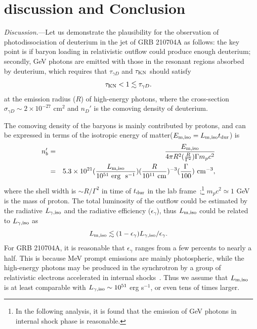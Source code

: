 \documentclass[linenumbers,twocolumn]{aastex631}
\begin{document}
\section{discussion and Conclusion }\label{sec:discussion}

\textit{Discussion.}---Let us demonstrate
the plausibility for the observation of photodissociation of deuterium in the jet of GRB 210704A as follows: the key point is if baryon loading in relativistic outflow could produce enough deuterium;
secondly, GeV photons are emitted with those in the resonant regions absorbed by deuterium, which requires that $\tau_{\gamma D}$ and $\tau_{\rm KN}$ should satisfy 
\begin{equation}\label{eq:criterion}
    \tau_{\rm KN}<1\lesssim\tau_{\gamma D}.
\end{equation}
at the emission radius ($R$) of high-energy photons, where the cross-section $\sigma_{\gamma D} \sim 2 \times 10^{-27}$ cm$^2$ and $n_D'$ is the comoving density of deuterium. 

The comoving density of the baryons is mainly contributed by protons, and can be expressed in terms of the isotropic energy of matter($E_{\rm m, iso}=L_{\rm m, iso} t_{\rm dur}$) is 
\begin{eqnarray}\label{eq:nbp}
     n^{\prime}_{b}&=&\frac{E_{\rm m, iso} }{4\pi R^2 (\frac{R}{\Gamma^2})  \Gamma m_p c^2}\nonumber\\
     &=&5.3\times 10^{21} (\frac{L_{\rm m, iso}}{10^{51}\ \rm erg \ \ s^{-1}})(\frac{R}{10^{11}\ \rm cm})^{-3} (\frac{\Gamma}{100})  \ \rm{cm^{-3}}, \nonumber\\
\end{eqnarray}
 where the shell width is $\sim R/\Gamma^2$ in time of $t_{\rm dur}$ in the lab frame~\citep{2018pgrb.book.....Z};\footnote{ In the following analysis, it is found that the emission of GeV photons in internal shock phase is reasonable.} $m_p c^2\simeq 1$ GeV is the mass of proton. The total luminosity of the outflow could be estimated by the radiative $L_{\gamma, \rm iso}$ and the radiative efficiency ($\epsilon_\gamma$), thus $L_{\rm m, iso}$ could be related to $L_{\gamma, \rm iso}$ as
\begin{equation}
    L_{\rm m, iso}\lesssim (1-\epsilon_\gamma)L_{\gamma, \rm iso}/\epsilon_\gamma. 
\end{equation}
For GRB 210704A, it is reasonable that $\epsilon_\gamma$ ranges from a few percents to nearly a half. This is because MeV prompt emissions are mainly photospheric, while the high-energy photons may be produced in the synchrotron by a group of relativistic electrons accelerated in internal shocks~\citep[e.g.,][]{2011ApJ...726...90Z,2008FrPhC...3..306F}. Thus we assume that $L_{\rm m, iso}$ is at least comparable with $L_{\gamma, \rm iso}\sim 10^{51}$ erg s$^{-1}$, or even tens of times larger.
\end{document}
